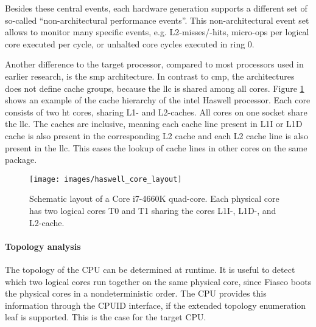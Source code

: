 Besides these central events, each hardware generation supports a different set
of so-called ``non-architectural performance events''.
This non-architectural event set allows to monitor many specific events, e.g.
L2-misses/-hits, micro-ops per logical core executed per cycle, or unhalted
core cycles executed in ring 0.

Another difference to the target processor, compared to most processors used in
earlier research, is the \gls{smp} architecture.
In contrast to \gls{cmp}, the architectures does not define cache groups,
because the \gls{llc} is shared among all cores.
Figure \ref{state:fig:core_layout} shows an example of the cache hierarchy of
the \gls{intel} Haswell processor.
Each core consists of two \gls{ht} cores, sharing L1- and L2-caches.
All cores on one socket share the \gls{llc}.
The caches are inclusive, meaning each cache line present in L1I or L1D
cache is also present in the corresponding L2 cache and each L2 cache line is
also present in the \gls{llc}.
This eases the lookup of cache lines in other cores on the same package.


\begin{figure}[h!]
  \centering
  \texttt{[image: images/haswell\_core\_layout]}
  \caption{Schematic layout of a Core i7-4660K quad-core.
    Each physical core has two logical cores T0 and T1 sharing the cores L1I-,
    L1D-, and L2-cache.}
  \label{state:fig:core_layout}
\end{figure}

\paragraph{Topology analysis}
The topology of the CPU can be determined at runtime.
It is useful to detect which two logical cores run together on the same
physical core, since Fiasco boots the physical cores in a nondeterministic order.
The CPU provides this information through the CPUID interface, if the
extended topology enumeration leaf is supported. This is the case for the
target CPU.

